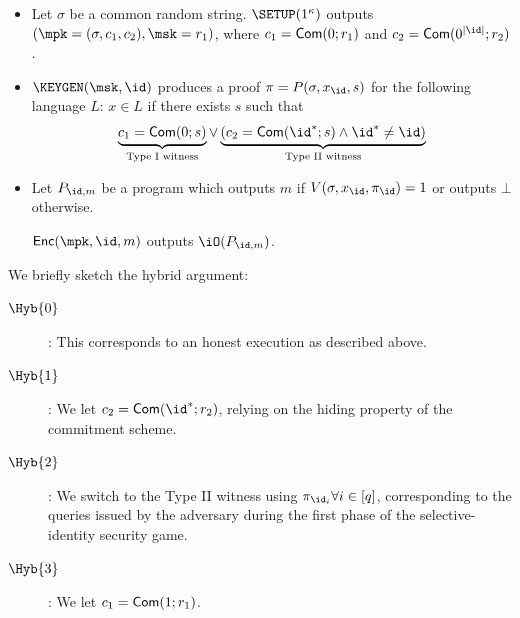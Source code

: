 \documentclass[12pt]{tufte-book}
\newcommand{\Enc}{\mathsf{Enc}}
\begin{document}
\begin{itemize}
\item
	Let $\sigma$ be a common random string.
	$\SETUP(1^\kappa)$ outputs $(\mpk = (\sigma, c_1, c_2), \msk =
	r_1)$, where $c_1 = \mathsf{Com}(0 ; r_1)$ and
	$c_2 = \Com(0^{|\id|} ; r_2)$.

\item
	$\KEYGEN(\msk, \id)$ produces a proof
	$\pi = P(\sigma, x_{\id}, s)$ for the following language $L$:
	$x \in L$ if there exists $s$ such that
\begin{equation*}
\underbrace{c_1 = \Com(0 ; s)}_{\text{Type I witness}} \lor
\underbrace{\left( c_2 = \Com(\id^* ; s) \land \id^* \ne \id
	\right)}_{\text{Type II witness}}
\end{equation*}

\item
	Let $P_{\id,m}$ be a program which outputs $m$ if
	$V(\sigma, x_{\id}, \pi_{\id}) = 1$ or outputs $\bot$ otherwise.

	$\Enc(\mpk, \id, m)$ outputs $\iO(P_{\id,m})$.
\end{itemize}

We briefly sketch the hybrid argument:
\begin{description}
\item[$\Hyb{0}$]:
	This corresponds to an honest execution as described above.
\item[$\Hyb{1}$]:
	We let $c_2 = \Com(\id^* ; r_2)$, relying on the hiding property
	of the commitment scheme.
\item[$\Hyb{2}$]:
	We switch to the Type II witness using
	$\pi_{\id_i} \forall i \in [q]$, corresponding to the queries
	issued by the adversary during the first phase of the
	selective-identity security game.
\item[$\Hyb{3}$]:
	We let $c_1 = \mathsf{Com}(1 ; r_1)$.
\end{description}







\newcommand{\extline}{$\scriptsize$-$\normalsize$\!}
\newcommand{\lextlineend}{$\scriptsize$\lhd\!$\normalsize$}
\newcommand{\rextlineend}{$\scriptsize\rule{.1ex}{0ex}$\rhd$\normalsize$}


\newcommand\extlines[1]{\setcounter{index}{0}\whiledo {\value{index}< #1}
  {\addtocounter{index}{1}\extline}
}

\newcommand\rextlinearrow[2]{$
  \setbox0\hbox{$\extlines{#2}\rextlineend$}\tiny$\!\!\!\!\begin{array}{c}\mathrm{#1}\\\usebox0\end{array}$\normalsize$\!\!}
\end{document}

